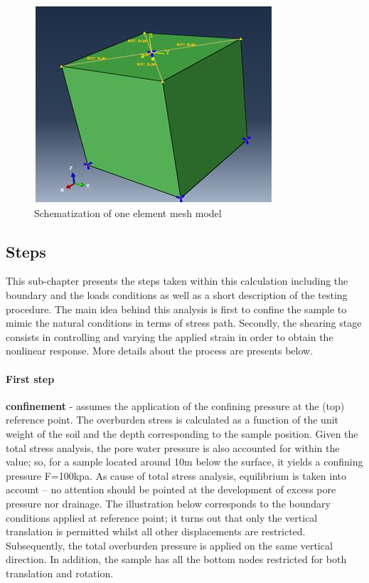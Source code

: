 \documentclass[12pt,a4paper]{report}
\begin{document}
\begin{figure}[h!]
	\centering
	\includegraphics[width=0.7\linewidth]{"1dmodel"}
	\caption{Schematization of one element mesh model }
	\label{cube}
\end{figure}

\subsection{Steps}
This sub-chapter presents the steps taken within this calculation including the boundary and the loads conditions as well as a short description of the testing procedure. The main idea behind this analysis is first to confine the sample to mimic the natural conditions in terms of stress path. Secondly, the shearing stage consists in controlling and varying the applied strain in order to obtain the nonlinear response. More details about the process are presents below. 
\paragraph{First step}
\textbf{confinement }- assumes the application of the confining pressure at the (top) reference point. The overburden stress is calculated as a function of the unit weight of the soil and the depth corresponding to the sample position. Given the total stress analysis, the pore water pressure is also accounted for within the value; so, for a sample located around 10m below the surface, it yields a confining pressure F=100kpa. As cause of total stress analysis, equilibrium is taken into account – no attention should be pointed at the development of excess pore pressure nor drainage. The illustration below corresponds to the boundary conditions applied at reference point; it turns out that only the vertical translation is permitted whilst all other displacements are restricted. Subsequently, the total overburden pressure is applied on the same vertical direction. In addition, the sample has all the bottom nodes restricted for both translation and rotation. 
\end{document}
